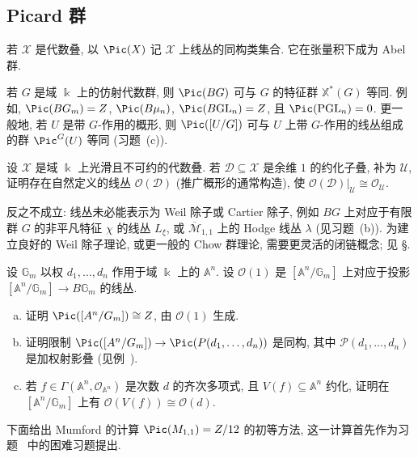 \subsection{Picard 群}\label{src:7.1.4-subsection}
若 $\mathcal X$ 是代数叠, 以 $\Pic(\mathcal X)$ 记 $\mathcal X$ 上线丛的同构类集合. 它在张量积下成为 Abel 群.
\begin{example}\label{src:7.1.18}
若 $G$ 是域 $\Bbbk$ 上的仿射代数群, 则 $\Pic(BG)$ 可与 $G$ 的特征群 $\mathbb X^*(G)$ 等同. 例如, $\Pic(B\mathbb G_m)=\mathbb Z$, $\Pic(B\mu_n)$, $\Pic(B\mathrm{GL}_n)=\mathbb Z$, 且 $\Pic(\mathrm{PGL}_n)=0$. 更一般地, 若 $U$ 是带 $G$-作用的概形, 则 $\Pic([U/G])$ 可与 $U$ 上带 $G$-作用的线丛组成的群 $\Pic^G(U)$ 等同 (习题~(c)).
\end{example}
\begin{exercise}\label{src:7.1.19}
设 $\mathcal X$ 是域 $\Bbbk$ 上光滑且不可约的代数叠. 若 $\mathcal D\subseteq\mathcal X$ 是余维 $1$ 的约化子叠, 补为 $\mathcal U$, 证明存在自然定义的线丛 $\mathcal O(\mathcal D)$ (推广概形的通常构造), 使 $\mathcal O(\mathcal D)|_{\mathcal U}\cong\mathcal O_{\mathcal U}$.
\end{exercise}
反之不成立: 线丛未必能表示为 Weil 除子或 Cartier 除子, 例如 $BG$ 上对应于有限群 $G$ 的非平凡特征 $\chi$ 的线丛 $L_\xi$, 或 $\overline{\mathcal M}_{1,1}$ 上的 Hodge 线丛 $\lambda$ (见习题~(b)). 为建立良好的 Weil 除子理论, 或更一般的 Chow 群理论, 需要更灵活的闭链概念; 见 \S{}.
\begin{exercise}\label{src:7.1.20}
设 $\mathbb G_m$ 以权 $d_1,\ldots,d_n$ 作用于域 $\Bbbk$ 上的 $\mathbb A^n$. 设 $\mathcal O(1)$ 是 $[\mathbb A^n/\mathbb G_m]$ 上对应于投影 $[\mathbb A^n/\mathbb G_m]\to B\mathbb G_m$ 的线丛.
\begin{enumerate}[(a)]
\item 证明 $\Pic([\mathbb A^n/\mathbb G_m])\cong\mathbb Z$, 由 $\mathcal O(1)$ 生成.
\item 证明限制 $\Pic([\mathbb A^n/\mathbb G_m])\to\Pic(\mathcal P(d_1,\ldots,d_n))$ 是同构, 其中 $\mathcal P(d_1,\ldots,d_n)$ 是加权射影叠 (见例~).
\item 若 $f\in\Gamma(\mathbb A^n,\mathcal O_{\mathbb A^n})$ 是次数 $d$ 的齐次多项式, 且 $V(f)\subseteq\mathbb A^n$ 约化, 证明在 $[\mathbb A^n/\mathbb G_m]$ 上有 $\mathcal O(V(f))\cong\mathcal O(d)$.
\end{enumerate}
\end{exercise}
下面给出 Mumford 的计算 $\Pic(\mathcal M_{1,1})=\mathbb Z/12$ 的初等方法, 这一计算首先作为习题~ 中的困难习题提出.
